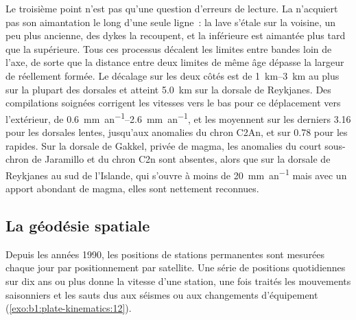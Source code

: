 Le troisième point n'est pas qu'une question d'erreurs de lecture. La  n'acquiert pas
son aimantation le long d'une seule ligne~: la lave s'étale sur la  voisine,
un peu plus ancienne, des dykes la recoupent, et la  inférieure est aimantée
plus tard que la supérieure. Tous ces processus décalent les limites entre bandes
loin de l'axe, de sorte que la distance entre deux limites de même âge
dépasse la largeur de  réellement formée. Le décalage sur les deux côtés est de
\qtyrange{1}{3}{km} au plus sur la plupart des dorsales et atteint \qty{5.0}{km} sur la dorsale de
Reykjanes. Des compilations soignées corrigent les vitesses vers le bas pour ce
déplacement vers l'extérieur, de \qtyrange{0.6}{2.6}{mm.an^{-1}}, et les moyennent sur les
derniers \qty{3.16}{\Ma} pour les dorsales lentes, jusqu'aux anomalies du chron C2An, et
sur \qty{0.78}{\Ma} pour les rapides. Sur la dorsale de Gakkel, privée de magma, les
anomalies du court sous-chron de Jaramillo et du chron C2n sont absentes, alors que sur
la dorsale de Reykjanes au sud de l'Islande, qui s'ouvre à moins de
\qty{20}{mm.an^{-1}} mais avec un apport abondant de magma, elles sont nettement
reconnues.

\subsection*{La géodésie spatiale}

Depuis les années 1990, les positions de stations permanentes sont mesurées chaque
jour par positionnement par satellite. Une série de positions quotidiennes sur dix ans ou
plus donne la vitesse d'une station, une fois traités les mouvements saisonniers et les sauts
dus aux séismes ou aux changements d'équipement
(\cref{exo:b1:plate-kinematics:12}).


